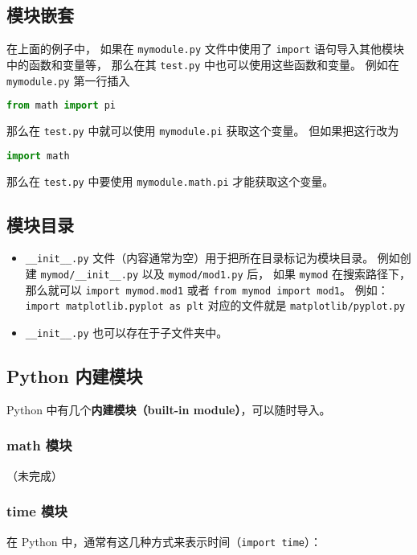 \subsection{模块嵌套}
在上面的例子中， 如果在 \verb|mymodule.py| 文件中使用了 \verb|import| 语句导入其他模块中的函数和变量等， 那么在其 \verb|test.py| 中也可以使用这些函数和变量。 例如在 \verb|mymodule.py| 第一行插入
\begin{lstlisting}[language=python]
from math import pi
\end{lstlisting}
那么在 \verb|test.py| 中就可以使用 \verb|mymodule.pi| 获取这个变量。 但如果把这行改为
\begin{lstlisting}[language=python]
import math
\end{lstlisting}
那么在 \verb|test.py| 中要使用 \verb|mymodule.math.pi| 才能获取这个变量。

\subsection{模块目录}
\begin{itemize}
\item \verb|__init__.py| 文件（内容通常为空）用于把所在目录标记为模块目录。 例如创建 \verb|mymod/__init__.py| 以及 \verb|mymod/mod1.py| 后， 如果 \verb|mymod| 在搜索路径下， 那么就可以 \verb|import mymod.mod1| 或者 \verb|from mymod import mod1|。 例如： \verb|import matplotlib.pyplot as plt| 对应的文件就是 \verb|matplotlib/pyplot.py|
\item \verb|__init__.py| 也可以存在于子文件夹中。
\end{itemize}


\subsection{Python 内建模块}
Python 中有几个\textbf{内建模块（built-in module）}，可以随时导入。

\subsubsection{math 模块}
（未完成）

\subsubsection{time 模块}
在 Python 中，通常有这几种方式来表示时间（\verb|import time|）：

